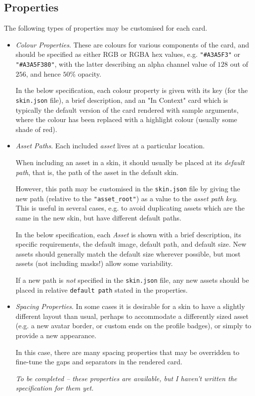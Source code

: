 \documentclass[a4paper, 10pt]{report}
\begin{document}
\subsection{Properties}
The following types of properties may be customised for each card.
\begin{itemize}
  \item \emph{Colour Properties}. These are colours for various components of the card, and should be specified
    as either RGB or RGBA hex values, e.g. \texttt{"\#A3A5F3"} or \texttt{"\#A3A5F380"},
    with the latter describing an alpha channel value of $128$ out of $256$, and hence $50\%$ opacity.

    In the below specification, each colour property is given with its key (for the \texttt{skin.json} file),
    a brief description, and an "In Context" card which is typically the default version of the card rendered with sample arguments,
    where the colour has been replaced with a highlight colour (usually some shade of red).
  \item \emph{Asset Paths}. Each included \emph{asset} lives at a particular location.

    When including an asset in a skin, it should usually be placed at its \emph{default path},
    that is, the path of the asset in the default skin.

    However, this path may be customised in the \texttt{skin.json} file
    by giving the new path (relative to the \texttt{"asset\_root"}) as a value to the \emph{asset path key}.
    This is useful in several cases, e.g. to avoid duplicating assets which are the same in the new skin,
    but have different default paths.

    In the below specification, each \emph{Asset} is shown with a brief description, its specific requirements,
    the default image, default path, and default size. New assets should generally match the default size wherever possible,
    but most assets (not including masks!) allow some variability.

    If a new path is \emph{not} specified in the \texttt{skin.json} file,
    any new assets should be placed in relative \texttt{default path} stated in the properties.
  \item \emph{Spacing Properties}.
    In some cases it is desirable for a skin to have a slightly different layout than usual, perhaps to accommodate
    a differently sized asset (e.g. a new avatar border, or custom ends on the profile badges), or simply to provide a new appearance.

    In this case, there are many spacing properties that may be overridden to fine-tune the gaps and separators in the rendered card.

    \emph{To be completed -- these properties are available, but I haven't written the specification for them yet.}
\end{itemize}
\end{document}
